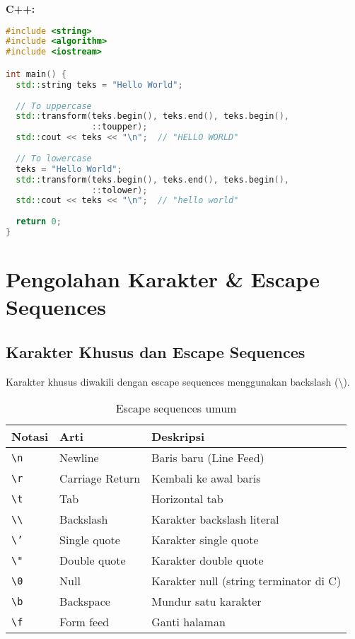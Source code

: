 \documentclass[../main.tex]{subfiles}
\begin{document}
\textbf{C++:}
\begin{lstlisting}[language=C++, caption={Case conversion di C++}]
#include <string>
#include <algorithm>
#include <iostream>

int main() {
  std::string teks = "Hello World";
  
  // To uppercase
  std::transform(teks.begin(), teks.end(), teks.begin(), 
                 ::toupper);
  std::cout << teks << "\n";  // "HELLO WORLD"
  
  // To lowercase
  teks = "Hello World";
  std::transform(teks.begin(), teks.end(), teks.begin(), 
                 ::tolower);
  std::cout << teks << "\n";  // "hello world"
  
  return 0;
}
\end{lstlisting}

\section{Pengolahan Karakter \& Escape Sequences}

\subsection{Karakter Khusus dan Escape Sequences}

Karakter khusus diwakili dengan escape sequences menggunakan backslash (\textbackslash).

\begin{table}[H]
  \centering
  \caption{Escape sequences umum}
  \begin{tabular}{@{}lll@{}}
    \toprule
    Notasi & Arti & Deskripsi \\
    \midrule
    \texttt{\textbackslash n} & Newline & Baris baru (Line Feed) \\
    \texttt{\textbackslash r} & Carriage Return & Kembali ke awal baris \\
    \texttt{\textbackslash t} & Tab & Horizontal tab \\
    \texttt{\textbackslash\textbackslash} & Backslash & Karakter backslash literal \\
    \texttt{\textbackslash'} & Single quote & Karakter single quote \\
    \texttt{\textbackslash"} & Double quote & Karakter double quote \\
    \texttt{\textbackslash 0} & Null & Karakter null (string terminator di C) \\
    \texttt{\textbackslash b} & Backspace & Mundur satu karakter \\
    \texttt{\textbackslash f} & Form feed & Ganti halaman \\
    \bottomrule
  \end{tabular}
\end{table}
\end{document}
